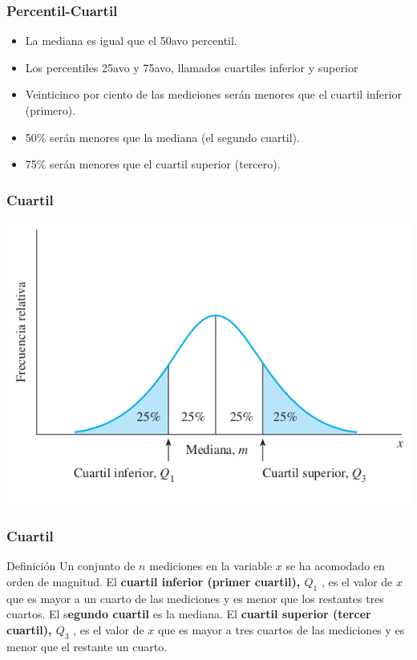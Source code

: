 \documentclass[spanish]{beamer}
\begin{document}
\begin{frame}
\frametitle{Percentil-Cuartil}

\begin{itemize}
\item La mediana es igual que el 50avo percentil.
\item Los percentiles 25avo y 75avo, llamados cuartiles inferior y superior
\item Veinticinco por ciento de las mediciones serán menores que el cuartil inferior (primero).
\item 50\% serán menores que la mediana (el segundo cuartil).
\item 75\% serán menores que el cuartil superior (tercero).
\end{itemize}

\end{frame}
\begin{frame}
\frametitle{Cuartil}

\begin{center}
\includegraphics[scale=0.4]{im26}
\end{center}

\end{frame}
\begin{frame}
\frametitle{Cuartil}

\begin{block}{Definición}
Un conjunto de $n$ mediciones en la variable $x$ se ha acomodado en orden
de magnitud. El \textbf{cuartil inferior (primer cuartil), $Q_{1}$ }, es el valor de $x$ que es mayor a un cuarto de las mediciones y es menor que los restantes tres cuartos. El s\textbf{egundo cuartil} es la mediana. El \textbf{cuartil superior (tercer cuartil), $Q_{3}$ }, es el valor de $x$ que es mayor a tres cuartos de las mediciones y es menor que el restante un cuarto.
\end{block}

\end{frame}
\end{document}
